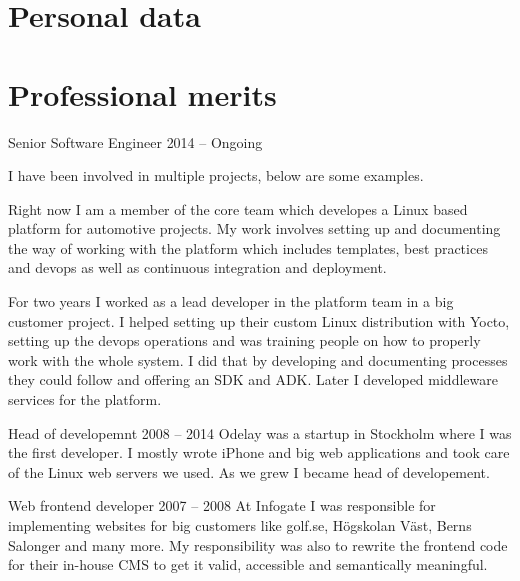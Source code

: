 \documentclass{twocolcv}
\begin{document}
\section*{Personal data}
\section*{Professional merits}
           {Senior Software Engineer}
           {2014 -- Ongoing}
           {
             {I have been involved in multiple projects, below are some examples.\newline}
             
        {Right now I am a member of the core team which developes a Linux based platform for automotive projects. My work involves setting up and documenting the way of working with the platform which includes templates, best practices and devops as well as continuous integration and deployment.\newline}
        
        {For two years I worked as a lead developer in the platform team in a big customer project. I helped setting up their custom Linux distribution with Yocto, setting up the devops operations and was training people on how to properly work with the whole system. I did that by developing and documenting processes they could follow and offering an SDK and ADK. Later I developed middleware services for the platform.}
}

     {Head of developemnt}
     {2008 -- 2014}
     {Odelay was a startup in Stockholm where I was the first developer. I mostly wrote iPhone and big web applications and took care of the Linux web servers we used. As we grew I became head of developement.}

     {Web frontend developer}
     {2007 -- 2008}
     {At Infogate I was responsible for implementing websites for big customers like golf.se, Högskolan Väst, Berns Salonger and many more. My responsibility was also to rewrite the frontend code for their in-house CMS to get it valid, accessible and semantically meaningful.}
\end{document}
